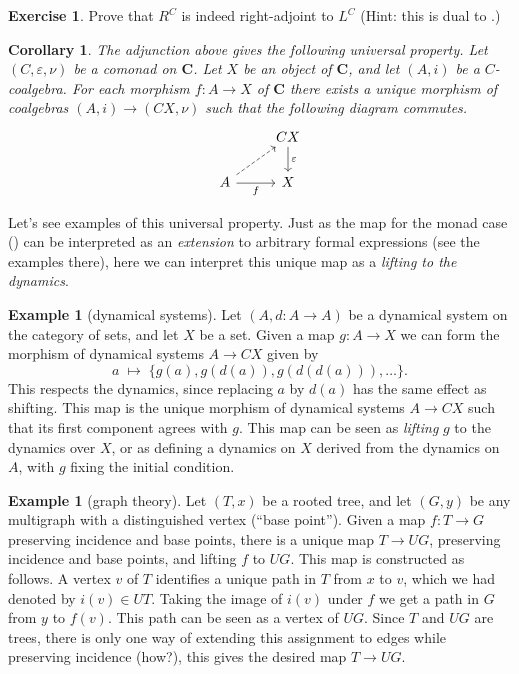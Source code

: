 \documentclass[a4paper,11pt,oneside]{scrbook}
\numberwithin{equation}{section}
\theoremstyle{plain}
\newtheorem{cor}[thm]{Corollary}
\theoremstyle{definition}
\newtheorem{eg}[thm]{Example}
\newtheorem{ex}[thm]{Exercise}
\newcommand{\cat}[1]{{\mathbf{#1}}} %
\newcommand{\ar}[2][]{\arrow{#2}{#1}}
\newcommand{\uni}[2][]{\arrow[dashrightarrow]{#2}{#1}} %
\newcommand{\e}{\varepsilon}
\DeclareMathOperator{\1}{\mathbbm{1}}
\DeclareMathOperator{\2}{\mathbbm{2}}
\begin{document}
\begin{ex}
 Prove that $R^C$ is indeed right-adjoint to $L^C$ (Hint: this is dual to .)
\end{ex}

\begin{cor}
 The adjunction above gives the following universal property. Let $(C,\e,\nu)$ be a comonad on $\cat{C}$. Let $X$ be an object of $\cat{C}$, and let $(A,i)$ be a $C$-coalgebra. For each morphism $f:A\to X$ of $\cat{C}$ there exists a unique morphism of coalgebras $(A,i)\to (CX,\nu)$ such that the following diagram commutes.
 $$
 \begin{tikzcd}
 & CX \ar{d}{\e} \\
 A \uni{ur} \ar{r}[swap]{f} & X
 \end{tikzcd}
 $$
\end{cor}

Let's see examples of this universal property. Just as the map for the monad case () can be interpreted as an \emph{extension} to arbitrary formal expressions (see the examples there), here we can interpret this unique map as a \emph{lifting to the dynamics}.

\begin{eg}[dynamical systems]
 Let $(A,d:A\to A)$ be a dynamical system on the category of sets, and let $X$ be a set. Given a map $g:A\to X$ we can form the morphism of dynamical systems $A\to CX$ given by 
 $$
 a\;\longmapsto\; \{g(a), g(d(a)), g(d(d(a))),\dots\} .
 $$
 This respects the dynamics, since replacing $a$ by $d(a)$ has the same effect as shifting. This map is the unique morphism of dynamical systems $A\to CX$ such that its first component agrees with $g$. This map can be seen as \emph{lifting} $g$ to the dynamics over $X$, or as defining a dynamics on $X$ derived from the dynamics on $A$, with $g$ fixing the initial condition.
\end{eg}

\begin{eg}[graph theory]
 Let $(T,x)$ be a rooted tree, and let $(G,y)$ be any multigraph with a distinguished vertex (``base point''). Given a map $f:T\to G$ preserving incidence and base points, there is a unique map $T\to UG$, preserving incidence and base points, and lifting $f$ to $UG$. This map is constructed as follows. A vertex $v$ of $T$ identifies a unique path in $T$ from $x$ to $v$, which we had denoted by $i(v)\in UT$. Taking the image of $i(v)$ under $f$ we get a path in $G$ from $y$ to $f(v)$. This path can be seen as a vertex of $UG$. Since $T$ and $UG$ are trees, there is only one way of extending this assignment to edges while preserving incidence (how?), this gives the desired map $T\to UG$. 
\end{eg}
\end{document}
